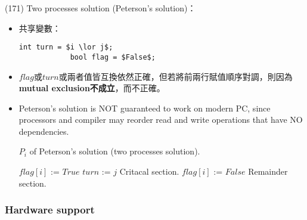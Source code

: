 \begin{theorem}{(171)} Two processes solution (Peterson's solution)：\begin{itemize}
        \item 共享變數：\begin{lstlisting}[caption={Shared variables of Peterson's solution (two processes solution).}, captionpos=b, mathescape=true]
            int turn = $i \lor j$;
            bool flag = $False$;
        \end{lstlisting}
        \item $flag$或$turn$或兩者值皆互換依然正確，但若將前兩行賦值順序對調，則因為\textbf{mutual exclusion不成立}，而不正確。
        \item Peterson's solution is NOT guaranteed to work on modern PC, since processors and compiler may reorder read and write operations that have NO dependencies.
        \begin{algorithm}[H]
            \caption{$P_i$ of Peterson's solution (two processes solution).}
            \begin{algorithmic}[1]
                    \Repeat 
                        \State $flag[i]$ := $True$
                        \State $turn$ := $j$
                        \EndWhile
                        \State Critacal section.
                        \State $flag[i]$ := $False$
                        \State Remainder section.
                \EndFunction
            \end{algorithmic}
        \end{algorithm}
    \end{itemize}
\end{theorem}

\subsubsection{Hardware support}

